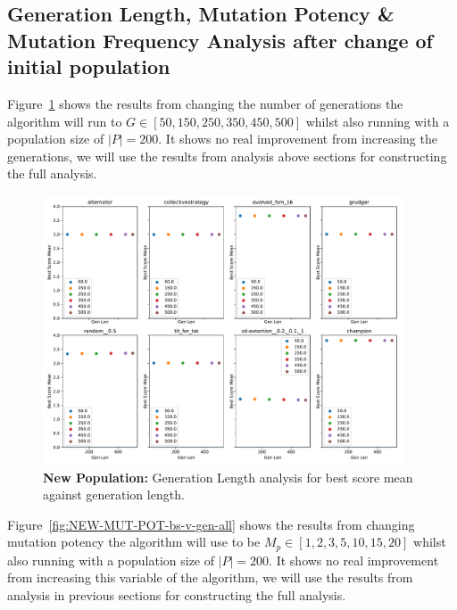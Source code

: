 \subsection{Generation Length, Mutation Potency \& Mutation Frequency Analysis after change of initial population}\label{subsec:starting_pop_analysis}
Figure~\ref{fig:NEW-GEN-bs-v-gen-all} shows the results from changing the number of generations the algorithm will run to \(G \in [50,150,250,350,450,500] \) whilst also running with a population size of \(|P|=200\).
It shows no real improvement from increasing the generations, we will use the results from analysis above sections for constructing the full analysis.

\begin{figure}[ht]
    \includegraphics[width=0.95\textwidth, keepaspectratio, center]{./img/plots/NEW_GEN_bs_v_gen_all.pdf}
    \caption{\textbf{New Population:} Generation Length analysis for best score mean against generation length.}\label{fig:NEW-GEN-bs-v-gen-all}
\end{figure}

Figure~\ref{fig:NEW-MUT-POT-bs-v-gen-all} shows the results from changing mutation potency the algorithm will use to be \(M_p \in [1,2,3,5,10,15,20] \) whilst also running with a population size of \(|P|=200\).
It shows no real improvement from increasing this variable of the algorithm, we will use the results from analysis in previous sections for constructing the full analysis.

